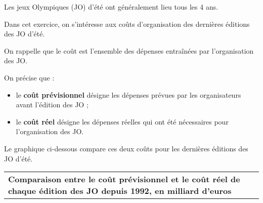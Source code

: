 \documentclass[11pt]{article}
\begin{document}
\begin{exercice}[1]

\medskip

Les jeux Olympiques (JO) d'été ont généralement lieu tous les 4 ans.

Dans cet exercice, on s'intéresse aux coûts d'organisation des dernières éditions des JO d'été.

On rappelle que le coût est l'ensemble des dépenses entraînées par l'organisation des JO.

On précise que :

\begin{itemize}
\item le \textbf{coût prévisionnel} désigne les dépenses prévues par les organisateurs avant l'édition des JO ;
\item le \textbf{coût réel} désigne les dépenses réelles qui ont été nécessaires pour l'organisation des JO.
\end{itemize}

Le graphique ci-dessous compare ces deux coûts pour les dernières éditions des JO d'été.

\medskip

\begin{tabularx}{\linewidth}{|>{\centering \arraybackslash}X|}\hline
\textbf{Comparaison entre le coût prévisionnel et le coût réel de chaque édition des JO depuis 1992, en milliard d'euros}\\


\end{tabularx}
\end{exercice}
\end{document}
